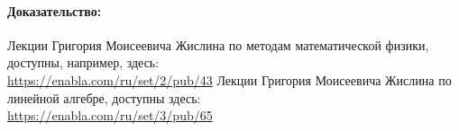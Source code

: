 \documentclass[a4paper,russian]{article}
\begin{document}
 \paragraph{Доказательство:}


\newpage
\begin{thebibliography}{5}
Лекции Григория Моисеевича Жислина по методам математической физики, доступны, например, здесь:\\ \url{https://enabla.com/ru/set/2/pub/43}
Лекции Григория Моисеевича Жислина по линейной алгебре, доступны здесь:\\
\url{https://enabla.com/ru/set/3/pub/65}
\end{thebibliography}
\end{document}
